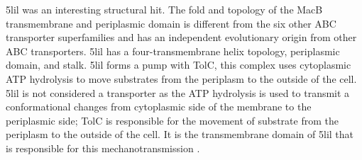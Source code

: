 5lil was an interesting structural hit. The fold and topology of the MacB transmembrane and periplasmic domain is different from the six other ABC transporter superfamilies and has an independent evolutionary origin from other ABC transporters. 5lil has a four-transmembrane helix topology, periplasmic domain, and stalk.  5lil forms a pump with TolC,  this complex uses cytoplasmic ATP hydrolysis to move substrates from the periplasm to the outside of the cell. 5lil is not considered a transporter as the ATP hydrolysis is used to transmit a conformational changes from cytoplasmic side of the membrane to the periplasmic side; TolC is responsible for the movement of substrate from the periplasm to the outside of the cell. It is the transmembrane domain of 5lil that is responsible for this mechanotransmission \cite{pichoff2019roles}.

